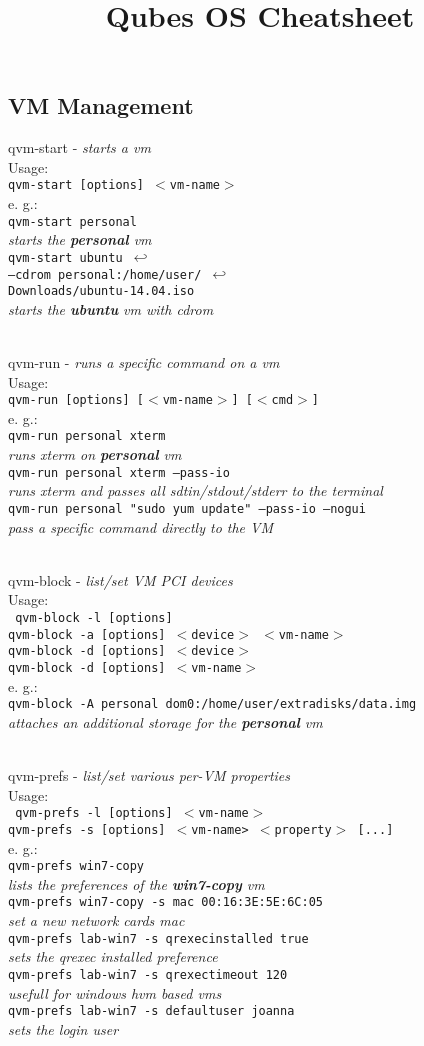 \documentclass[10pt,a4paper,landscape,twocolumn]{scrartcl}
\title{Qubes OS Cheatsheet}
\newcommand{\desc}[2]{\noindent #1 - \textit{#2} \\}
\newcommand{\usage}[1]{ Usage: \\ \texttt{#1} \\}
\newenvironment{examplebox}{e. g.: \\}{}
\newcommand{\example}[2]{\texttt{#1} \\ \textit{#2} \\}
\newcommand{\vm}[1]{\textbf{#1} vm}
\newenvironment{cmdblock}{}{\\}
\newcommand{\n}{$\hookleftarrow$ \\ }
\begin{document}
\maketitle
\subsection*{VM Management}
\begin{cmdblock}
	\desc{qvm-start}{starts a vm}
	\usage{qvm-start [options] $<$vm-name$>$}
	\begin{examplebox}
		\example{qvm-start personal}{starts the \vm{personal}}
		\example{qvm-start ubuntu \n --cdrom personal:/home/user/ \n Downloads/ubuntu-14.04.iso}{starts the \vm{ubuntu} with cdrom}
	\end{examplebox}
\end{cmdblock}

\begin{cmdblock}
	\desc{qvm-run}{runs a specific command on a vm}
	\usage{qvm-run [options] [$<$vm-name$>$] [$<$cmd$>$]}
	\begin{examplebox}
		\example{qvm-run personal xterm}{runs xterm on \vm{personal}}
		\example{qvm-run personal xterm --pass-io}{runs xterm and passes all sdtin/stdout/stderr to the terminal}
		\example{qvm-run personal "sudo yum update" --pass-io --nogui}{pass a specific command directly to the VM}
	\end{examplebox}
\end{cmdblock}

\begin{cmdblock}
	\desc{qvm-block}{list/set VM PCI devices}
	\usage{
		qvm-block -l [options]\\
		qvm-block -a [options] $<$device$>$ $<$vm-name$>$\\
		qvm-block -d [options] $<$device$>$\\
		qvm-block -d [options] $<$vm-name$>$
	}
	\begin{examplebox}
		\example{qvm-block -A personal dom0:/home/user/extradisks/data.img}{attaches an additional storage for the \vm{personal} }
	\end{examplebox}
\end{cmdblock}

\begin{cmdblock}
	\desc{qvm-prefs}{list/set various per-VM properties}
	\usage{
		qvm-prefs -l [options] $<$vm-name$>$\\
		qvm-prefs -s [options] $<$vm-name> $<$property$>$ [...]
	}
	\begin{examplebox}
		\example{qvm-prefs win7-copy}{lists the preferences of the \vm{win7-copy} }
		\example{qvm-prefs win7-copy -s mac 00:16:3E:5E:6C:05}{set a new network cards mac}
		\example{qvm-prefs lab-win7 -s qrexec\textunderscore installed true}{sets the qrexec installed preference}
		\example{qvm-prefs lab-win7 -s qrexec\textunderscore timeout 120}{usefull for windows hvm based vms}
		\example{qvm-prefs lab-win7 -s default\textunderscore user joanna}{sets the login user}
	\end{examplebox}
\end{cmdblock}
\end{document}
